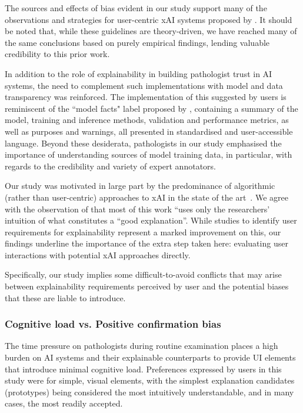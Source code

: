 \documentclass[final,5p,times,twocolumn,hyphens]{elsarticle}
\begin{document}
The sources and effects of bias evident in our study support many of the observations and strategies for user-centric xAI systems proposed by \citet{wang_designing_2019}. It should be noted that, while these guidelines are theory-driven, we have reached many of the same conclusions based on purely empirical findings, lending valuable credibility to this prior work.

In addition to the role of explainability in building pathologist trust in AI systems, the need to complement such implementations with model and data transparency was reinforced. The implementation of this suggested by users is reminiscent of the ``model facts" label proposed by \citet{sendak2020presenting}, containing a summary of the model, training and inference methods, validation and performance metrics, as well as purposes and warnings, all presented in standardised and user-accessible language. Beyond these desiderata, pathologists in our study emphasised the importance of understanding sources of model training data, in particular, with regards to the credibility and variety of expert annotators.

Our study was motivated in large part by the predominance of algorithmic (rather than user-centric) approaches to xAI in the state of the art~\cite{tjoa_survey_2020, poceviciute_survey_2020, antoniadi2021current}. We agree with the observation of \citet{miller2019explanation} that most of this work ``uses only the researchers' intuition of what constitutes a ``good explanation''. While studies to identify user requirements for explainability represent a marked improvement on this, our findings underline the importance of the extra step taken here: evaluating user interactions with potential xAI approaches directly.

Specifically, our study implies some difficult-to-avoid conflicts that may arise between explainability requirements perceived by user and the potential biases that these are liable to introduce.

\subsubsection{Cognitive load vs. Positive confirmation bias}

The time pressure on pathologists during routine examination places a high burden on AI systems and their explainable counterparts to provide UI elements that introduce minimal cognitive load. Preferences expressed by users in this study were for simple, visual elements, with the simplest explanation candidates (prototypes) being considered the most intuitively understandable, and in many cases, the most readily accepted.
\end{document}
